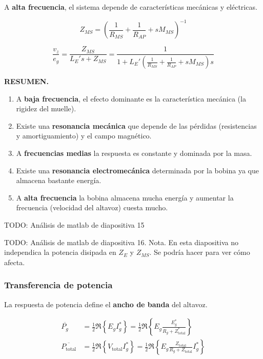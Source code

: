 \documentclass[12pt, a4paper]{article}
\begin{document}
A \textbf{alta frecuencia}, el sistema depende de características mecánicas y eléctricas.

\[ Z_{MS} = \left( \frac{1}{R_{MS}} + \frac{1}{R_{AP}} + s M_{MS}  \right) ^{-1} \]

\[ \frac{v_z}{e_g} = \frac{Z_{MS}}{L_E's + Z_{MS}} = \frac{1}{1 + L_E' \left( \frac{1}{R_{MS}} + \frac{1}{R_{AP}} + sM_{MS} \right) s }  \]

\textbf{RESUMEN.} 
\begin{enumerate}
     \item A \textbf{baja frecuencia}, el efecto dominante es la característica mecánica (la rigidez del muelle).
     \item Existe una \textbf{resonancia mecánica} que depende de las pérdidas (resistencias y amortiguamiento) y el campo magnético.
     \item A \textbf{frecuencias medias} la respuesta es constante y dominada por la masa.
     \item Existe una \textbf{resonancia electromecánica} determinada por la bobina ya que almacena bastante energía.
     \item A \textbf{alta frecuencia} la bobina almacena mucha energía y aumentar la frecuencia (velocidad del altavoz) cuesta mucho.
\end{enumerate}

TODO: Análisis de matlab de diapositiva 15

TODO: Análisis de matlab de diapositiva 16. Nota. En esta diapositiva no independica la potencia disipada en $Z_E$ y $Z_{MS}$. Se podría hacer para ver cómo afecta.

\subsubsection{Transferencia de potencia}

La respuesta de potencia define el \textbf{ancho de banda} del altavoz.

\begin{align*}
    \overline{P_g} &= \frac{1}{2} \Re \left\lbrace E_g I_g^* \right\rbrace = \frac{1}{2} \Re \left\lbrace E_g \frac{E_g^*}{R_g + Z^*_{\text{total}}} \right\rbrace \\
    \overline{P _{\text{total}}} &= \frac{1}{2} \Re \left\lbrace V _{\text{total}} I_g^* \right\rbrace = \frac{1}{2} \Re \left\lbrace E_g \frac{Z_{\text{total}}}{R_g + Z_{\text{total}}} I_g^* \right\rbrace 
\end{align*}
\end{document}
